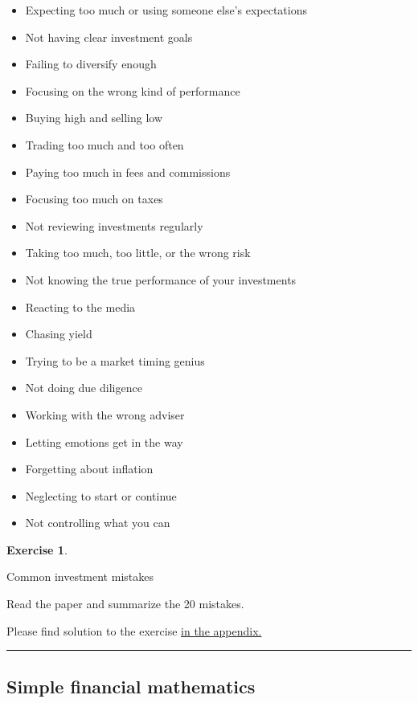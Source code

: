 \documentclass[
  12pt,
  oneside]{book}
\providecommand{\tightlist}{%
  \setlength{\itemsep}{0pt}\setlength{\parskip}{0pt}}
\theoremstyle{definition}
\theoremstyle{definition}
\theoremstyle{definition}
\newtheorem{exercise}{Exercise}[chapter]
\theoremstyle{definition}
\theoremstyle{remark}
\begin{document}
\begin{itemize}
\tightlist
\item
  Expecting too much or using someone else's expectations
\item
  Not having clear investment goals
\item
  Failing to diversify enough
\item
  Focusing on the wrong kind of performance
\item
  Buying high and selling low
\item
  Trading too much and too often
\item
  Paying too much in fees and commissions
\item
  Focusing too much on taxes
\item
  Not reviewing investments regularly
\item
  Taking too much, too little, or the wrong risk
\item
  Not knowing the true performance of your investments
\item
  Reacting to the media
\item
  Chasing yield
\item
  Trying to be a market timing genius
\item
  Not doing due diligence
\item
  Working with the wrong adviser
\item
  Letting emotions get in the way
\item
  Forgetting about inflation
\item
  Neglecting to start or continue
\item
  Not controlling what you can
\end{itemize}

\begin{exercise}
\protect\hypertarget{exr:commistakes}{}\label{exr:commistakes}

Common investment mistakes

Read the paper and summarize the 20 mistakes.

Please find solution to the exercise \hyperref[sol:commistakes]{in the appendix.}

\begin{center}\rule{0.5\linewidth}{0.5pt}\end{center}

\end{exercise}

\subsection{Simple financial mathematics}\label{simple-financial-mathematics}
\end{document}
